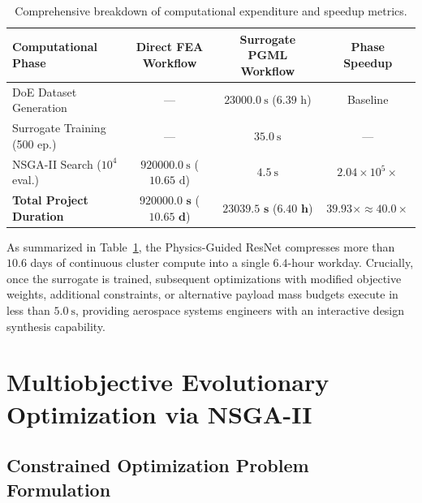 \begin{table}[htbp]
\centering
\caption{Comprehensive breakdown of computational expenditure and speedup metrics.}
\label{tab:speedup_breakdown}
\begin{tabular*}{\textwidth}{@{\extracolsep{\fill}}lccc@{\extracolsep{\fill}}}
\toprule
\textbf{Computational Phase} & \textbf{Direct FEA Workflow} & \textbf{Surrogate PGML Workflow} & \textbf{Phase Speedup} \\
\midrule
DoE Dataset Generation & --- & $\SI{23000.0}{\second}$ ($6.39\text{ h}$) & Baseline \\
Surrogate Training (500 ep.) & --- & $\SI{35.0}{\second}$ & --- \\
NSGA-II Search ($10^4$ eval.) & $\SI{920000.0}{\second}$ ($10.65\text{ d}$) & $\SI{4.5}{\second}$ & $2.04 \times 10^5\times$ \\
\midrule
\textbf{Total Project Duration} & $\mathbf{920000.0\text{ s}}$ ($\mathbf{10.65\text{ d}}$) & $\mathbf{23039.5\text{ s}}$ ($\mathbf{6.40\text{ h}}$) & $\mathbf{39.93\times \approx 40.0\times}$ \\
\bottomrule
\end{tabular*}
\end{table}

As summarized in Table~\ref{tab:speedup_breakdown}, the Physics-Guided ResNet compresses more than $10.6$ days of continuous cluster compute into a single $6.4$-hour workday. Crucially, once the surrogate is trained, subsequent optimizations with modified objective weights, additional constraints, or alternative payload mass budgets execute in less than $\SI{5.0}{\second}$, providing aerospace systems engineers with an interactive design synthesis capability.

\section{Multiobjective Evolutionary Optimization via NSGA-II}
\label{sec:nsga2_optimization}

\subsection{Constrained Optimization Problem Formulation}


